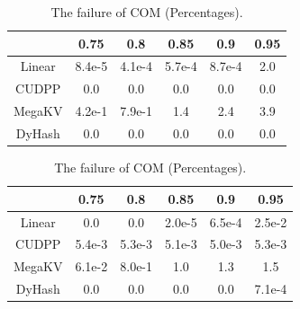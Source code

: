 \begin{table}[ht]
\begin{minipage}{0.45\linewidth}
		\begin{tabular}{|c|c|c|c|c|c|}
			\hline
			& 0.75 & 0.8 & 0.85 & 0.9 & 0.95\\ \hline
			Linear &8.4e-5 & 4.1e-4 &5.7e-4  & 8.7e-4 & 2.0 \\ \hline
			CUDPP & 0.0 & 0.0 &0.0  & 0.0 & 0.0 \\ \hline
			MegaKV &4.2e-1 & 7.9e-1 &1.4  & 2.4 & 3.9 \\ \hline
			DyHash &0.0 & 0.0 &0.0  & 0.0 & 0.0 \\ \hline
		\end{tabular}
		\label{tab:fail:rand}
	\end{minipage}
	\begin{minipage}{0.45\linewidth}\centering
		\caption{The failure of COM (Percentages).}
		\begin{tabular}{|c|c|c|c|c|c|}
			\hline
			& 0.75 & 0.8 & 0.85 & 0.9 & 0.95\\ \hline
			Linear &0.0 & 0.0 &2.0e-5  & 6.5e-4 & 2.5e-2 \\ \hline
			CUDPP & 5.4e-3 & 5.3e-3 &5.1e-3  & 5.0e-3 & 5.3e-3 \\ \hline
			MegaKV &6.1e-2 & 8.0e-1 &1.0  & 1.3 & 1.5 \\ \hline
			DyHash &0.0 & 0.0 &0.0  & 0.0 & 7.1e-4 \\ \hline
		\end{tabular}
		\label{tab:fail:com}
	\end{minipage}
\end{table}
